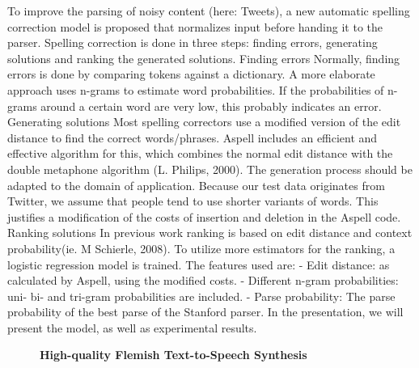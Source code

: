 \documentclass[10pt, a4paper, twopage, headinclude, footinclude, BCOR5mm]{scrartcl}
\begin{document}
        \begin{table}[t!]
    \end{table}

\noindent
To improve the parsing of noisy content (here: Tweets), a new automatic spelling correction model is proposed that normalizes input before handing it to the parser. Spelling correction is done in three steps: finding errors, generating solutions and ranking the generated solutions.  Finding errors Normally, finding errors is done by comparing tokens against a dictionary. A more elaborate  approach uses n-grams to estimate word probabilities. If the probabilities of n-grams around a certain word are very low, this probably indicates an error.  Generating solutions Most spelling correctors use a modified version of the edit distance to find the correct words/phrases. Aspell includes an efficient and effective algorithm for this, which combines the normal edit distance with the double metaphone algorithm (L. Philips, 2000). The generation process should be adapted to the domain of application. Because our test data originates from Twitter, we assume that people tend to use shorter variants of words. This justifies a modification of the costs of insertion and deletion in the Aspell code.  Ranking solutions In previous work ranking is based on edit distance and context probability(ie. M Schierle, 2008). To utilize more estimators for the ranking, a logistic regression model is trained. The features used are:  - Edit distance: as calculated by Aspell, using the modified costs. - Different n-gram probabilities: uni- bi- and tri-gram probabilities are included. - Parse probability: The parse probability of the best parse of the Stanford parser.  In the presentation, we will present the model, as well as experimental results.


\newpage

\begin{figure}[t!]
\centering
\large\textbf{High-quality Flemish Text-to-Speech Synthesis}
\vspace*{0.5cm}
\end{figure}
\end{document}
